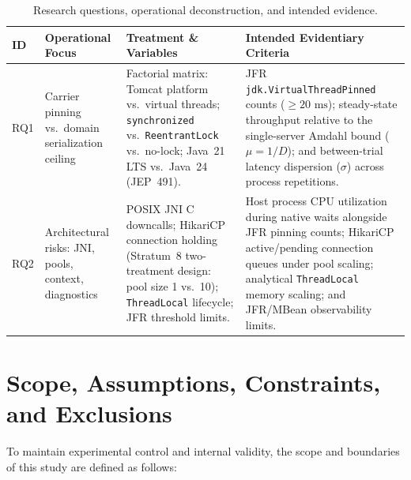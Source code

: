 \begin{table}[htbp]
  \centering
  \small
  \caption{Research questions, operational deconstruction, and intended evidence.}
  \label{tab:research-questions}
  \begin{tabularx}{\textwidth}{@{}p{}>{\raggedright\arraybackslash}p{}>{\raggedright\arraybackslash}p{}>{\raggedright\arraybackslash}X@{}}
    \toprule
    \textbf{ID} & \textbf{Operational Focus} & \textbf{Treatment \& Variables} & \textbf{Intended Evidentiary Criteria} \\
    \midrule
    RQ1 & Carrier pinning vs.\ domain serialization ceiling & Factorial matrix: Tomcat platform vs.\ virtual threads; \texttt{synchronized} vs.\ \texttt{ReentrantLock} vs.\ no-lock; Java~21 LTS vs.\ Java~24 (JEP~491). & JFR \texttt{jdk.VirtualThreadPinned} counts ($\ge 20\text{ ms}$); steady-state throughput relative to the single-server Amdahl bound ($\mu = 1/D$); and between-trial latency dispersion ($\sigma$) across process repetitions. \\
    \addlinespace
    RQ2 & Architectural risks: JNI, pools, context, diagnostics & POSIX JNI C downcalls; HikariCP connection holding (Stratum~8 two-treatment design: pool size 1 vs.\ 10); \texttt{ThreadLocal} lifecycle; JFR threshold limits. & Host process CPU utilization during native waits alongside JFR pinning counts; HikariCP active/pending connection queues under pool scaling; analytical \texttt{ThreadLocal} memory scaling; and JFR/MBean observability limits. \\
    \bottomrule
  \end{tabularx}
\end{table}

\section{Scope, Assumptions, Constraints, and Exclusions}
\label{sec:scope-constraints}

To maintain experimental control and internal validity, the scope and boundaries of this study are defined as follows:

